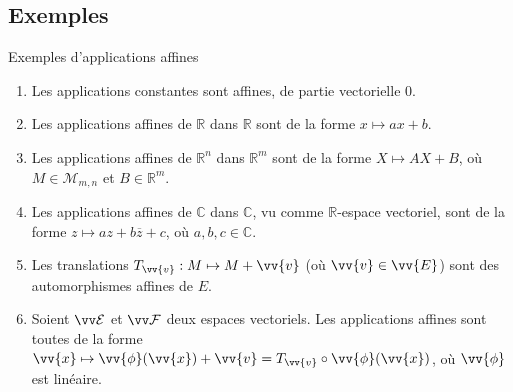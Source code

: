 \documentclass[bigger]{m53beamer}
\begin{document}
\subsection{Exemples}
  \begin{frame}{Exemples d'applications affines}
    \begin{enumerate}[<+(1)->]
      \item Les applications constantes sont affines, de partie vectorielle $0$.
      \item Les applications affines de $\mathbb{R}$ dans $\mathbb{R}$ sont de la forme $x \mapsto ax+b$.
      \item Les applications affines de $\mathbb{R}^{n}$ dans $\mathbb{R}^{m}$ sont de la forme $X \mapsto AX+B$, où $M \in \mathcal{M}_{m,n}$ et $B \in \mathbb{R}^{m}$.
      \item Les applications affines de $\mathbb{C}$ dans $\mathbb{C}$, vu comme $\mathbb{R}$-espace vectoriel, sont de la forme $z \mapsto az+b\overline{z}+c$, où $a,b,c \in \mathbb{C}$.
      \item Les translations $T_{\vv{v}}:M \mapsto M+\vv{v}$ (où $\vv{v} \in \vv{E}$) sont des automorphismes affines de $E$.
      \item Soient $\ev{E}$ et $\ev{F}$ deux espaces vectoriels. Les applications affines sont toutes de la forme $\vv{x} \mapsto \vv{\phi}(\vv{x}) + \vv{v}=T_{\vv{v}}\circ\vv{\phi}(\vv{x})$, où $\vv{\phi}$ est linéaire.
    \end{enumerate}
  \end{frame}

\end{document}
